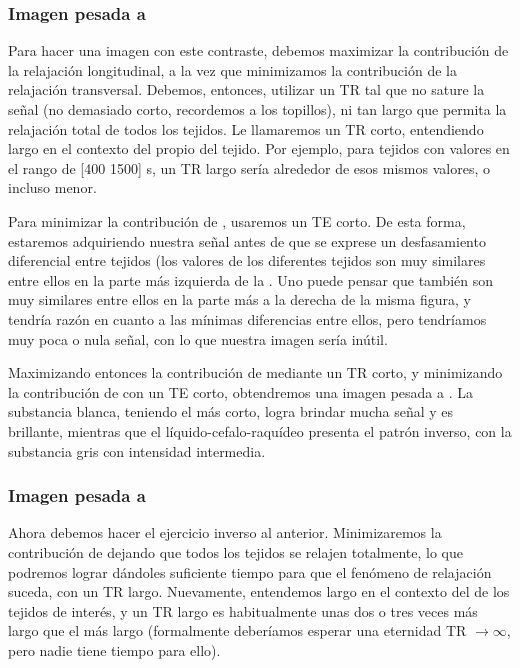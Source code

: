 \subsubsection{Imagen pesada a \Tone}
Para hacer una imagen con este contraste, debemos maximizar la contribución de la relajación longitudinal, a la vez que minimizamos la contribución de la relajación transversal. Debemos, entonces, utilizar un TR tal que no sature la señal (no demasiado corto, recordemos a los topillos), ni tan largo que permita la relajación total de todos los tejidos. Le llamaremos un TR corto, entendiendo largo en el contexto del \Tone propio del tejido. Por ejemplo, para tejidos con valores \Tone en el rango de [400 1500] s, un TR largo sería alrededor de esos mismos valores, o incluso menor.

Para minimizar la contribución de \Ttwo, usaremos un TE corto. De esta forma, estaremos adquiriendo nuestra señal antes de que se exprese un desfasamiento diferencial entre tejidos (los valores de los diferentes tejidos son muy similares entre ellos en la parte más izquierda de la \figurapendiente. Uno puede pensar que también son muy similares entre ellos en la parte más a la derecha de la misma figura, y tendría razón en cuanto a las mínimas diferencias entre ellos, pero tendríamos muy poca o nula señal, con lo que nuestra imagen sería inútil.

Maximizando entonces la contribución de \Tone mediante un TR corto, y minimizando la contribución de \Ttwo con un TE corto, obtendremos una imagen pesada a \Tone. La substancia blanca, teniendo el \Tone más corto, logra brindar mucha señal y es brillante, mientras que el líquido-cefalo-raquídeo presenta el patrón inverso, con la substancia gris con intensidad intermedia.

\subsubsection{Imagen pesada a \Ttwo}
Ahora debemos hacer el ejercicio inverso al anterior. Minimizaremos la contribución de \Tone dejando que todos los tejidos se relajen totalmente, lo que podremos lograr dándoles suficiente tiempo para que el fenómeno de relajación suceda, con un TR largo. Nuevamente, entendemos largo en el contexto del \Tone de los tejidos de interés, y un TR largo es habitualmente unas dos o tres veces más largo que el \Tone más largo (formalmente deberíamos esperar una eternidad TR $\xrightarrow{}\infty$, pero nadie tiene tiempo para ello).

